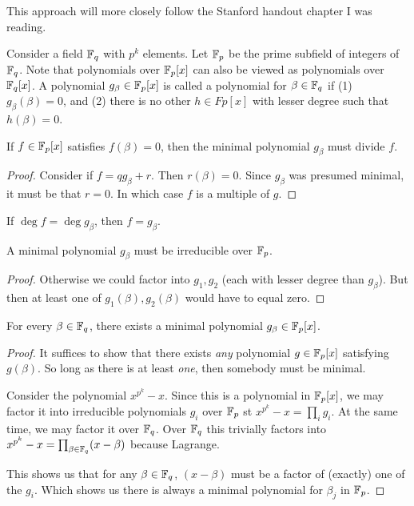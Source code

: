 \begin{remark}
  This approach will more closely follow the Stanford handout chapter I
  was reading.
\end{remark}

\begin{definition}
  Consider a field $\mathbb{F}_q$ with $p^k$ elements. Let $\mathbb{F}_p$ be the prime
  subfield of integers of $\mathbb{F}_q$. Note that polynomials over $\mathbb{F}_p[x]$ can
  also be viewed as polynomials over $\mathbb{F}_q[x]$. A polynomial $g_\beta \in
  \mathbb{F}_p[x]$ is called a  polynomial for $\beta \in \mathbb{F}_q$ if
  (1) $g_\beta(\beta) = 0$, and (2) there is no other $h \in Fp[x]$ with
  lesser degree such that $h(\beta) = 0$.
\end{definition}

\begin{proposition}
  If $f \in \mathbb{F}_p[x]$ satisfies $f(\beta) = 0$, then the minimal
  polynomial $g_\beta$ must divide $f$.
\end{proposition}

\begin{proof}
  Consider if $f = qg_\beta + r$. Then $r(\beta) = 0$. Since $g_\beta$
  was presumed minimal, it must be that $r = 0$. In which case $f$ is a
  multiple of $g$.
\end{proof}

\begin{corollary}
  If $\deg f = \deg g_\beta$, then $f = g_\beta$.
\end{corollary}

\begin{proposition}
  A minimal polynomial $g_\beta$ must be irreducible over $\mathbb{F}_p$.
\end{proposition}

\begin{proof}
  Otherwise we could factor into $g_1, g_2$ (each with lesser degree
  than $g_\beta$). But then at least one of $g_1(\beta), g_2(\beta)$
  would have to equal zero.
\end{proof}

\begin{proposition}
  For every $\beta \in \mathbb{F}_q$, there exists a minimal polynomial $g_\beta
  \in \mathbb{F}_p[x]$.
\end{proposition}

\begin{proof}
  It suffices to show that there exists \emph{any} polynomial $g \in
  \mathbb{F}_p[x]$ satisfying $g(\beta)$. So long as there is at least
  \emph{one}, then somebody must be minimal.

  Consider the polynomial $x^{p^k} - x$. Since this is a polynomial in
  $\mathbb{F}_p[x]$, we may factor it into irreducible polynomials $g_i$ over
  $\mathbb{F}_p$ st $x^{p^k} - x = \prod_i g_i$. At the same time, we may factor
  it over $\mathbb{F}_q$. Over $\mathbb{F}_q$ this trivially factors into $x^{p^k} - x =
  \prod_{\beta\in\mathbb{F}_q} (x - \beta)$ because Lagrange.

  This shows us that for any $\beta\in\mathbb{F}_q$, $(x - \beta)$ must be a
  factor of (exactly) one of the $g_i$. Which shows us there is always a
  minimal polynomial for $\beta_j$ in $\mathbb{F}_p$.
\end{proof}

